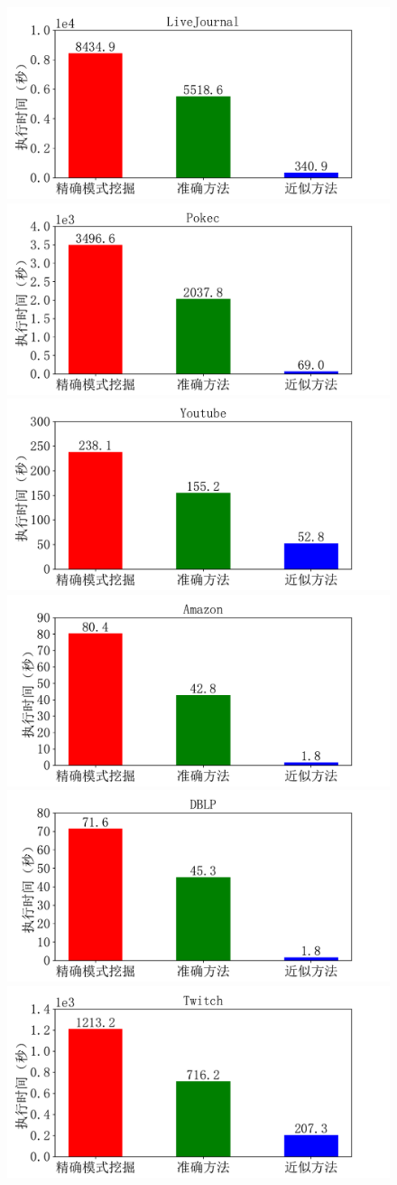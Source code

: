 \documentclass[master]{thesis-uestc}
\begin{document}
\begin{figure}
    \includegraphics[width=0.5\linewidth]{pic/fit-cmp-accurate/LiveJournal.pdf}%
    \includegraphics[width=0.5\linewidth]{pic/fit-cmp-accurate/Pokec.pdf}\\
    \includegraphics[width=0.5\linewidth]{pic/fit-cmp-accurate/Youtube.pdf}%
    \includegraphics[width=0.5\linewidth]{pic/fit-cmp-accurate/Amazon.pdf}\\
    \includegraphics[width=0.5\linewidth]{pic/fit-cmp-accurate/DBLP.pdf}%
    \includegraphics[width=0.5\linewidth]{pic/fit-cmp-accurate/Twitch.pdf}\\

\end{figure}
\end{document}
